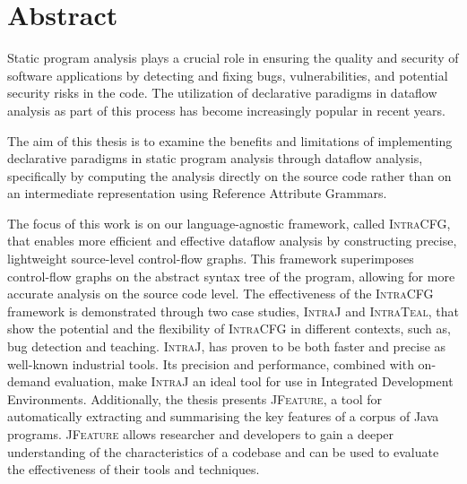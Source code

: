 \chapter{Abstract}


Static program analysis plays a crucial role in ensuring the quality and security of
software applications by detecting and fixing bugs, vulnerabilities,
and potential security risks in the code. The utilization of declarative paradigms
in dataflow analysis as part of this process has become increasingly popular in recent years.

The aim of this thesis is to examine the benefits and limitations of implementing
declarative paradigms in static program analysis through dataflow analysis, specifically
by computing the analysis directly on the source code rather than on an intermediate representation using
Reference Attribute Grammars.

The focus of this work is on our language-agnostic framework, called \textsc{IntraCFG},
that enables more efficient and effective dataflow analysis by constructing precise,
lightweight source-level control-flow graphs. This framework superimposes control-flow
graphs on the abstract syntax tree of the program, allowing for more accurate analysis
on the source code level. The effectiveness of the \textsc{IntraCFG} framework is
demonstrated through two case studies, \textsc{IntraJ} and \textsc{IntraTeal}, that
show the potential and the flexibility of \textsc{IntraCFG} in different contexts,
such as, bug detection and teaching.
\textsc{IntraJ}, has proven to be both faster and precise as well-known
industrial tools. Its precision and performance, combined with
on-demand evaluation, make \textsc{IntraJ} an ideal tool for use in
Integrated Development Environments.
Additionally, the thesis presents \textsc{JFeature}, a tool for automatically extracting
and summarising the key features of a corpus of Java programs. \textsc{JFeature} allows
researcher and developers to gain a deeper understanding of the characteristics of a codebase and
can be used to evaluate the effectiveness of their tools and techniques.






